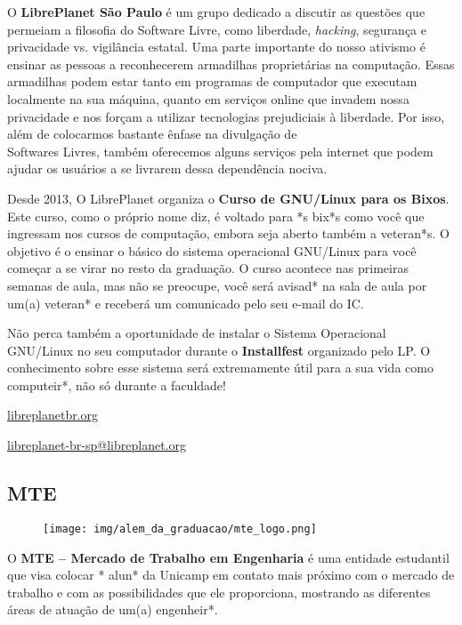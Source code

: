 O {\bf LibrePlanet São Paulo} é um grupo dedicado a discutir as questões que
permeiam a filosofia do Software Livre, como liberdade, \emph{hacking},
segurança e privacidade vs. vigilância estatal.  Uma parte importante do nosso
ativismo é ensinar as pessoas a reconhecerem armadilhas proprietárias na
computação. Essas armadilhas podem estar tanto em programas de computador que
executam localmente na sua máquina, quanto em serviços online que invadem nossa
privacidade e nos forçam a utilizar tecnologias prejudiciais à liberdade.  Por
isso, além de colocarmos bastante ênfase na divulgação de\\Softwares Livres,
também oferecemos alguns serviços pela internet que podem ajudar os usuários a
se livrarem dessa dependência nociva.

Desde 2013, O LibrePlanet organiza o {\bf Curso de GNU/Linux para os Bixos}.
Este curso, como o próprio nome diz, é voltado para *s bix*s como você que
ingressam nos cursos de computação, embora seja aberto também a veteran*s. O
objetivo é o ensinar o básico do sistema operacional GNU/Linux para você começar
a se virar no resto da graduação.  O curso acontece nas primeiras semanas de
aula, mas não se preocupe, você será avisad* na sala de aula por um(a) veteran* e
receberá um comunicado pelo seu e-mail do IC.

Não perca também a oportunidade de instalar o Sistema Operacional GNU/Linux no
seu computador durante o {\bf Installfest} organizado pelo LP.  O conhecimento
sobre esse sistema será extremamente útil para a sua vida como computeir*, não
só durante a faculdade!

\begin{compactitemize}
    \item  \url{libreplanetbr.org}
    \item  \url{libreplanet-br-sp@libreplanet.org}
\end{compactitemize}

\subsection{MTE}

\begin{figure}[h!]
    \centering
    \texttt{[image: img/alem\_da\_graduacao/mte\_logo.png]}
\end{figure}

O \textbf{MTE -- Mercado de Trabalho em Engenharia} é uma entidade estudantil
que visa colocar * alun* da Unicamp em contato mais próximo com o mercado de
trabalho e com as possibilidades que ele proporciona, mostrando as diferentes
áreas de atuação de um(a) engenheir*.

